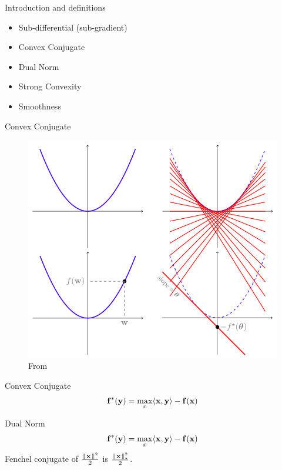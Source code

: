 
\begin{frame}{Introduction and definitions}
  \begin{itemize}
  \item Sub-differential (sub-gradient)
  \item Convex Conjugate
  \item Dual Norm
  \item Strong Convexity
  \item Smoothness
  \end{itemize}
\end{frame}

\begin{frame}{Convex Conjugate}
\begin{figure}
\includegraphics[scale=0.27]{images/fenchel.png}
\caption{From \cite{}}
\end{figure}
\end{frame}

\begin{frame}{Convex Conjugate}
\begin{align*}
\opt{\f}(\y) = \max_x \dotprod{\x}{\y} - \f(\x)
\end{align*}
\end{frame}

\begin{frame}{Dual Norm}
\begin{align*}
\opt{\f}(\y) = \max_x \dotprod{\x}{\y} - \f(\x)
\end{align*}
Fenchel conjugate of $\frac{\|\x\|^2}{2}$ is $\frac{\|\x\|_{*}^2}{2}$.
\end{frame}


